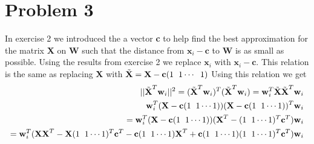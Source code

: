 \documentclass[a4paper,norsk]{article}
\begin{document}
\section{Problem 3}
In exercise 2 we introduced the a vector \textbf{c} to help find the best approximation for the matrix \textbf{X} on \textbf{W} such that the distance from $\textbf{x}_i - \textbf{c}$ to \textbf{W} is as small
as possible. Using the results from exercise 2 we replace $\textbf{x}_i$ with $\textbf{x}_i - \textbf{c}$. This relation is the same as replacing \textbf{X} with 
$\tilde{\textbf{X}} = \textbf{X} - \textbf{c}(1 \hspace{2mm} 1 \cdots \hspace{2mm} 1)$ 
Using this relation we get 
\begin{align*}
||\tilde{\textbf{X}}^T \textbf{w}_i ||^2 = (\tilde{\textbf{X}}^T \textbf{w}_i)^T (\tilde{\textbf{X}}^T \textbf{w}_i) =  \textbf{w}_i^T \tilde{\textbf{X}} \tilde{\textbf{X}}^T \textbf{w}_i \\
\textbf{w}_i^T (\textbf{X} - \textbf{c} (1 \hspace{2mm} 1 \cdots 1 )  ) (\textbf{X} - \textbf{c} (1 \hspace{2mm} 1 \cdots 1))^T \textbf{w}_i \\=
\textbf{w}_i^T (\textbf{X} - \textbf{c} (1 \hspace{2mm} 1 \cdots 1 )  ) (\textbf{X}^T - (1 \hspace{2mm} 1 \cdots 1)^T \textbf{c}^T) \textbf{w}_i \\=
\textbf{w}_i^T (\textbf{X}\textbf{X}^T - \textbf{X}(1 \hspace{2mm} 1 \cdots 1)^T\textbf{c}^T - \textbf{c}(1 \hspace{2mm} 1 \cdots 1)\textbf{X}^T +
 \textbf{c}(1 \hspace{2mm} 1 \cdots 1)(1 \hspace{2mm} 1 \cdots 1)^T \textbf{c}^T )\textbf{w}_i 
\end{align*}
\end{document}
